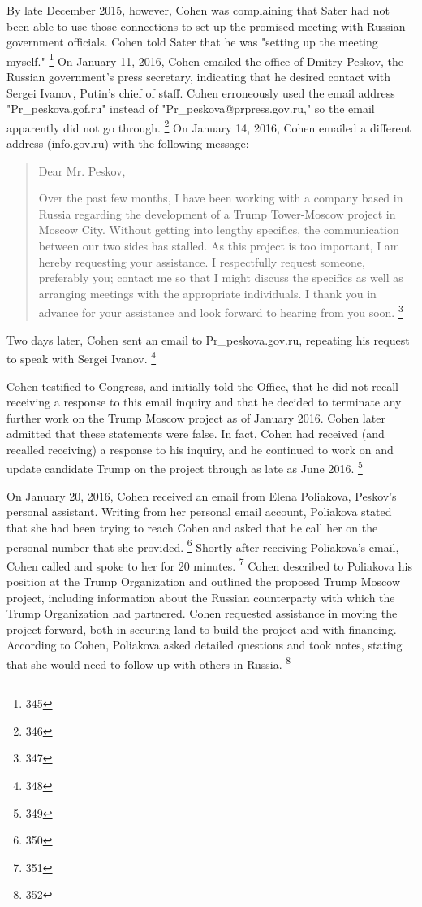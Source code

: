 By late December 2015, however, Cohen was complaining that Sater had not been able to use those connections to set up the promised meeting with Russian government officials.
Cohen told Sater that he was "setting up the meeting myself."%
\footnote{345}
On January 11, 2016, Cohen emailed the office of Dmitry Peskov, the Russian government's press secretary, indicating that he desired contact with Sergei Ivanov, Putin's chief of staff.
Cohen erroneously used the email address "Pr\_peskova\@prpress.gof.ru" instead of "Pr\_peskova@prpress.gov.ru," so the email apparently did not go through.%
\footnote{346}
On January 14, 2016, Cohen emailed a different address (info\@prpress.gov.ru) with the following message:

\begin{quote}
Dear Mr. Peskov,

Over the past few months, I have been working with a company based in Russia regarding the development of a Trump Tower-Moscow project in Moscow City.
Without getting into lengthy specifics, the communication between our two sides has stalled.
As this project is too important, I am hereby requesting your assistance.
I respectfully request someone, preferably you; contact me so that I might discuss the specifics as well as arranging meetings with the appropriate individuals.
I thank you in advance for your assistance and look forward to hearing from you soon.%
\footnote{347}
\end{quote}

Two days later, Cohen sent an email to Pr\_peskova\@prpress.gov.ru, repeating his request to speak with Sergei Ivanov.%
\footnote{348}

Cohen testified to Congress, and initially told the Office, that he did not recall receiving a response to this email inquiry and that he decided to terminate any further work on the Trump Moscow project as of January 2016.
Cohen later admitted that these statements were false.
In fact, Cohen had received (and recalled receiving) a response to his inquiry, and he continued to work on and update candidate Trump on the project through as late as June 2016.%
\footnote{349}

On January 20, 2016, Cohen received an email from Elena Poliakova, Peskov's personal assistant.
Writing from her personal email account, Poliakova stated that she had been trying to reach Cohen and asked that he call her on the personal number that she provided.%
\footnote{350}
Shortly after receiving Poliakova's email, Cohen called and spoke to her for 20 minutes.%
\footnote{351}
Cohen described to Poliakova his position at the Trump Organization and outlined the proposed Trump Moscow project, including information about the Russian counterparty with which the Trump Organization had partnered.
Cohen requested assistance in moving the project forward, both in securing land to build the project and with financing.
According to Cohen, Poliakova asked detailed questions and took notes, stating that she would need to follow up with others in Russia.%
\footnote{352}

